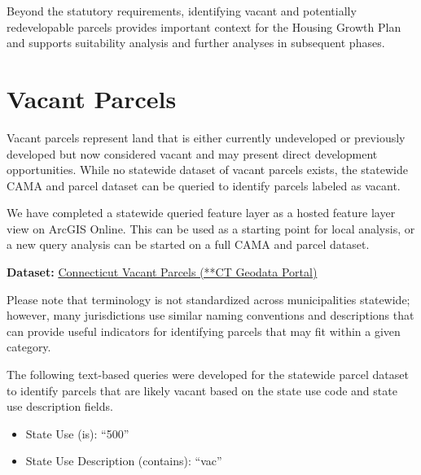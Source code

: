 \documentclass[
  letterpaper,
  DIV=11,
  numbers=noendperiod]{scrreprt}
\providecommand{\tightlist}{%
  \setlength{\itemsep}{0pt}\setlength{\parskip}{0pt}}
\begin{document}
Beyond the statutory requirements, identifying vacant and potentially
redevelopable parcels provides important context for the Housing Growth
Plan and supports suitability analysis and further analyses in
subsequent phases.

\section{Vacant Parcels}\label{vacant-parcels}

Vacant parcels represent land that is either currently undeveloped or
previously developed but now considered vacant and may present direct
development opportunities. While no statewide dataset of vacant parcels
exists, the statewide CAMA and parcel dataset can be queried to identify
parcels labeled as vacant.

We have completed a statewide queried feature layer as a hosted feature
layer view on ArcGIS Online. This can be used as a starting point for
local analysis, or a new query analysis can be started on a full CAMA
and parcel dataset.

\textbf{Dataset:}
\href{https://ctmaps.maps.arcgis.com/home/item.html?id=1e733783ba524d26b540961257bb0bcb\#overview}{Connecticut
Vacant Parcels (**CT Geodata Portal)}

\begin{tcolorbox}[enhanced jigsaw, arc=.35mm, bottomrule=.15mm, breakable, colback=white, colframe=quarto-callout-note-color-frame, left=2mm, leftrule=.75mm, opacityback=0, rightrule=.15mm, toprule=.15mm]
\begin{minipage}[t]{5.5mm}
\textcolor{quarto-callout-note-color}{\faInfo}
\end{minipage}%
\begin{minipage}[t]{\textwidth - 5.5mm}

Please note that terminology is not standardized across municipalities
statewide; however, many jurisdictions use similar naming conventions
and descriptions that can provide useful indicators for identifying
parcels that may fit within a given category.

\end{minipage}%
\end{tcolorbox}

The following text-based queries were developed for the statewide parcel
dataset to identify parcels that are likely vacant based on the state
use code and state use description fields.

\begin{itemize}
\tightlist
\item
  State Use (is): ``500''
\item
  State Use Description (contains): ``vac''
\end{itemize}
\end{document}
